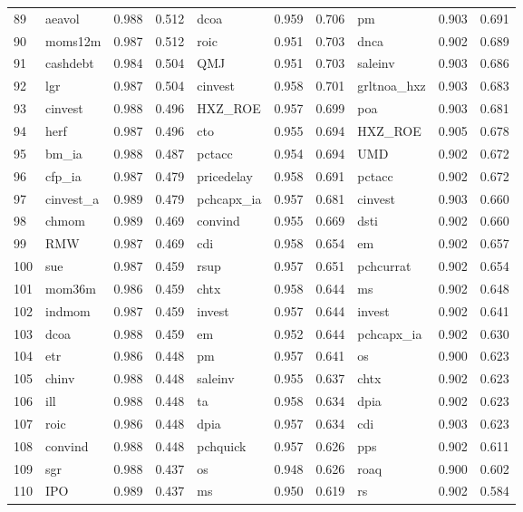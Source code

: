 \documentclass[12pt]{article}
\begin{document}
\begin{landscape}
\begin{footnotesize}
\begin{longtable}{l|lcc|lcc|lcc}
  89 & aeavol & 0.988 & 0.512 & dcoa & 0.959 & 0.706 & pm & 0.903 & 0.691 \\ 
  90 & moms12m & 0.987 & 0.512 & roic & 0.951 & 0.703 & dnca & 0.902 & 0.689 \\ 
  91 & cashdebt & 0.984 & 0.504 & QMJ & 0.951 & 0.703 & saleinv & 0.903 & 0.686 \\ 
  92 & lgr & 0.987 & 0.504 & cinvest & 0.958 & 0.701 & grltnoa\_hxz & 0.903 & 0.683 \\ 
  93 & cinvest & 0.988 & 0.496 & HXZ\_ROE & 0.957 & 0.699 & poa & 0.903 & 0.681 \\ 
  94 & herf & 0.987 & 0.496 & cto & 0.955 & 0.694 & HXZ\_ROE & 0.905 & 0.678 \\ 
  95 & bm\_ia & 0.988 & 0.487 & pctacc & 0.954 & 0.694 & UMD & 0.902 & 0.672 \\ 
  96 & cfp\_ia & 0.987 & 0.479 & pricedelay & 0.958 & 0.691 & pctacc & 0.902 & 0.672 \\ 
  97 & cinvest\_a & 0.989 & 0.479 & pchcapx\_ia & 0.957 & 0.681 & cinvest & 0.903 & 0.660 \\ 
  98 & chmom & 0.989 & 0.469 & convind & 0.955 & 0.669 & dsti & 0.902 & 0.660 \\ 
  99 & RMW & 0.987 & 0.469 & cdi & 0.958 & 0.654 & em & 0.902 & 0.657 \\ 
  100 & sue & 0.987 & 0.459 & rsup & 0.957 & 0.651 & pchcurrat & 0.902 & 0.654 \\ 
  101 & mom36m & 0.986 & 0.459 & chtx & 0.958 & 0.644 & ms & 0.902 & 0.648 \\ 
  102 & indmom & 0.987 & 0.459 & invest & 0.957 & 0.644 & invest & 0.902 & 0.641 \\ 
  103 & dcoa & 0.988 & 0.459 & em & 0.952 & 0.644 & pchcapx\_ia & 0.902 & 0.630 \\ 
  104 & etr & 0.986 & 0.448 & pm & 0.957 & 0.641 & os & 0.900 & 0.623 \\ 
  105 & chinv & 0.988 & 0.448 & saleinv & 0.955 & 0.637 & chtx & 0.902 & 0.623 \\ 
  106 & ill & 0.988 & 0.448 & ta & 0.958 & 0.634 & dpia & 0.902 & 0.623 \\ 
  107 & roic & 0.986 & 0.448 & dpia & 0.957 & 0.634 & cdi & 0.903 & 0.623 \\ 
  108 & convind & 0.988 & 0.448 & pchquick & 0.957 & 0.626 & pps & 0.902 & 0.611 \\ 
  109 & sgr & 0.988 & 0.437 & os & 0.948 & 0.626 & roaq & 0.900 & 0.602 \\ 
  110 & IPO & 0.989 & 0.437 & ms & 0.950 & 0.619 & rs & 0.902 & 0.584 \\ 

\end{longtable}
\end{footnotesize}
\end{landscape}
\end{document}
